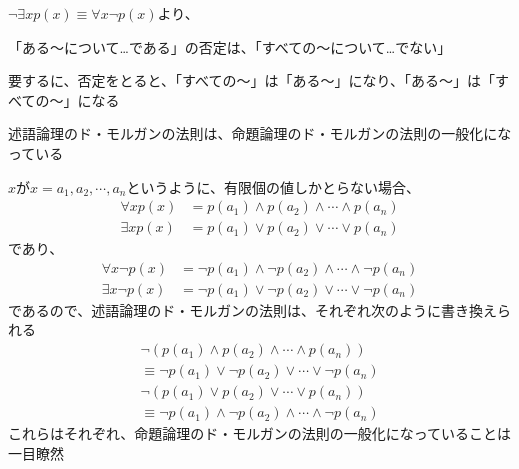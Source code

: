 \documentclass[b5paper,12pt]{jsarticle}
\begin{document}
$\neg \exists x p(x) \equiv \forall x \neg p(x)$より、
\begin{shaded}
  「ある〜について…である」の否定は、「すべての〜について…でない」
\end{shaded}

要するに、否定をとると、「すべての〜」は「ある〜」になり、「ある〜」は「すべての〜」になる

\sectionline

述語論理のド・モルガンの法則は、命題論理のド・モルガンの法則の一般化になっている

\br

$x$が$x = a_1, a_2, \cdots , a_n$というように、有限個の値しかとらない場合、
\begin{align*}
  \forall x p(x) & = p(a_1) \land p(a_2) \land \cdots \land p(a_n) \\
  \exists x p(x) & = p(a_1) \lor p(a_2) \lor \cdots \lor p(a_n)
\end{align*}
であり、
\begin{align*}
  \forall x \neg p(x) & = \neg p(a_1) \land \neg p(a_2) \land \cdots \land \neg p(a_n) \\
  \exists x \neg p(x) & = \neg p(a_1) \lor \neg p(a_2) \lor \cdots \lor \neg p(a_n)
\end{align*}
であるので、述語論理のド・モルガンの法則は、それぞれ次のように書き換えられる
\begin{multline}
  \neg (p(a_1) \land p(a_2) \land \cdots \land p(a_n)) \\ \equiv \neg p(a_1) \lor \neg p(a_2) \lor \cdots \lor \neg p(a_n)
\end{multline}
\begin{multline}
  \neg (p(a_1) \lor p(a_2) \lor \cdots \lor p(a_n)) \\ \equiv \neg p(a_1) \land \neg p(a_2) \land \cdots \land \neg p(a_n)
\end{multline}
これらはそれぞれ、命題論理のド・モルガンの法則の一般化になっていることは一目瞭然
\end{document}
